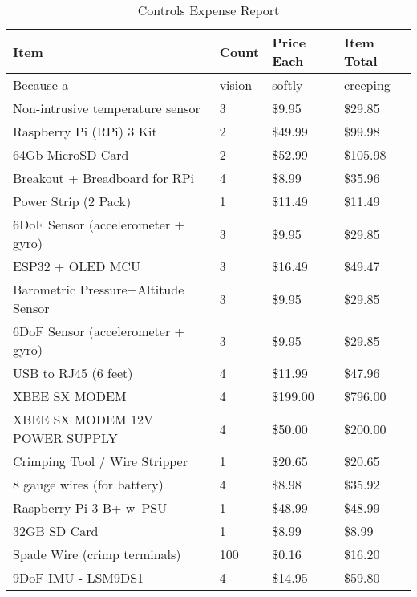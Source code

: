 
\begin{longtable}[H]{| L{8.0cm} | P{1.25cm} | P{2.0cm} | P{2.0cm} |}
\caption{\label{tab:controls_expense_report} Controls Expense Report}

\\ \hline
\textbf{Item}       & \textbf{Count}    & \textbf{Price Each}   & \textbf{Item Total}
\\ \hline

Because a                           & vision& softly    &   creeping    \\\hline
Non-intrusive temperature sensor    & 3	    & \$9.95	&   \$29.85     \\\hline
Raspberry Pi (RPi) 3 Kit		    & 2	    & \$49.99	&   \$99.98     \\\hline
64Gb MicroSD Card			        & 2	    & \$52.99	&   \$105.98    \\\hline
Breakout + Breadboard for RPi	    & 4	    & \$8.99	&   \$35.96     \\\hline
Power Strip (2 Pack)			    & 1	    & \$11.49	&   \$11.49     \\\hline
6DoF Sensor (accelerometer + gyro)  & 3	    & \$9.95	&   \$29.85     \\\hline
ESP32 + OLED MCU			        & 3	    & \$16.49	&   \$49.47     \\\hline
Barometric Pressure+Altitude Sensor & 3	    & \$9.95	&   \$29.85     \\\hline
6DoF Sensor (accelerometer + gyro)  & 3	    & \$9.95	&   \$29.85     \\\hline
USB to RJ45 (6 feet)			    & 4	    & \$11.99   &   \$47.96     \\\hline
XBEE SX MODEM			            & 4	    & \$199.00	&   \$796.00    \\\hline
XBEE SX MODEM 12V POWER SUPPLY		& 4	    & \$50.00	&   \$200.00    \\\hline
Crimping Tool / Wire Stripper		& 1	    & \$20.65	&   \$20.65     \\ gauge wires (for battery)			& 4	    & \$8.98	&   \$35.92     \\\hline
Raspberry Pi 3 B+ w\ PSU			& 1	    & \$48.99	&   \$48.99     \\\hline
32GB SD Card			            & 1	    & \$8.99	&   \$8.99      \\\hline
Spade Wire (crimp terminals)		& 100	& \$0.16	&   \$16.20     \\\hline
9DoF IMU - LSM9DS1			        & 4	    & \$14.95	&   \$59.80     \\\hline

\end{longtable}
